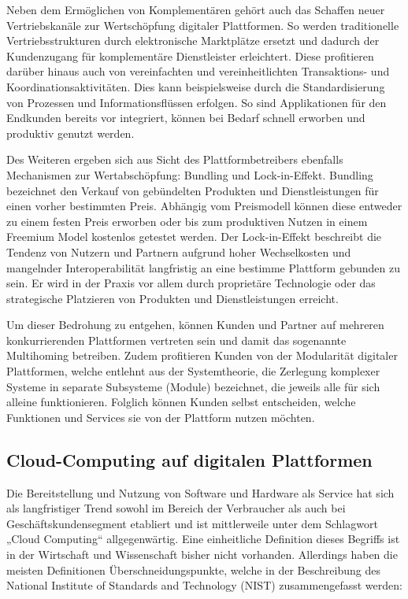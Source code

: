Neben dem Ermöglichen von Komplementären gehört auch das Schaffen neuer Vertriebskanäle zur Wertschöpfung digitaler Plattformen. So werden traditionelle Vertriebsstrukturen durch elektronische Marktplätze ersetzt und dadurch der Kundenzugang für komplementäre Dienstleister erleichtert. Diese profitieren darüber hinaus auch von vereinfachten und vereinheitlichten Transaktions- und Koordinationsaktivitäten. Dies kann beispielsweise durch die Standardisierung von Prozessen und Informationsflüssen erfolgen. So sind Applikationen für den Endkunden bereits vor integriert, können bei Bedarf schnell erworben und produktiv genutzt werden.\autocite[Vgl.][S. 599f.]{HAHN2016}

Des Weiteren ergeben sich aus Sicht des Plattformbetreibers ebenfalls Mechanismen zur Wertabschöpfung: Bundling und Lock-in-Effekt. Bundling bezeichnet den Verkauf von gebündelten Produkten und Dienstleistungen für einen vorher bestimmten Preis. Abhängig vom Preismodell können diese entweder zu einem festen Preis erworben oder bis zum produktiven Nutzen in einem Freemium Model kostenlos getestet werden.\autocite[Vgl.][S. 178-185]{TEECE2010} Der Lock-in-Effekt beschreibt die Tendenz von Nutzern und Partnern aufgrund hoher Wechselkosten und mangelnder Interoperabilität langfristig an eine bestimme Plattform gebunden zu sein. \autocite[Vgl.][S. 22]{STEUR2022} Er wird in der Praxis vor allem durch proprietäre Technologie oder das strategische Platzieren von Produkten und Dienstleistungen erreicht. \autocite[Vgl.][S. 704]{BALLON2011}

Um dieser Bedrohung zu entgehen, können Kunden und Partner auf mehreren konkurrierenden Plattformen vertreten sein und damit das sogenannte Multihoming betreiben. \autocite[Vgl.][S. 461ff]{CENNAMO2018} Zudem profitieren Kunden von der Modularität digitaler Plattformen, welche entlehnt aus der Systemtheorie, die Zerlegung komplexer Systeme in separate Subsysteme (Module) bezeichnet, die jeweils alle für sich alleine funktionieren. \autocite[Vgl.][S. 2]{LECHNER2019} Folglich können Kunden selbst entscheiden, welche Funktionen und Services sie von der Plattform nutzen möchten.

\subsection{Cloud-Computing auf digitalen Plattformen}

Die Bereitstellung und Nutzung von Software und Hardware als Service hat sich als langfristiger Trend sowohl im Bereich der Verbraucher als auch bei Geschäftskundensegment etabliert und ist mittlerweile unter dem Schlagwort „Cloud Computing“ allgegenwärtig. Eine einheitliche Definition dieses Begriffs ist in der Wirtschaft und Wissenschaft bisher nicht vorhanden. Allerdings haben die meisten Definitionen Überschneidungspunkte, welche in der Beschreibung des National Institute of Standards and Technology (NIST) zusammengefasst werden: 


